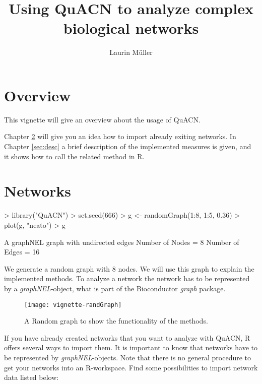 \documentclass[a4paper]{article}
\title{Using QuACN to analyze complex biological networks}
\author{Laurin M\"uller}
\begin{document}
\maketitle
\tableofcontents
\section{Overview}
This vignette will give an overview about the usage of QuACN. 

Chapter \ref{sec:nw} will give you an idea how to import already exiting networks. In Chapter \ref{sec:desc} a brief description of the implemented measures is given, and it shows how to call the related method in R.



\section{Networks}
\label{sec:nw}

\begin{Schunk}
\begin{Sinput}
> library("QuACN")
> set.seed(666)
> g <- randomGraph(1:8, 1:5, 0.36)
> plot(g, "neato")
> g
\end{Sinput}
\begin{Soutput}
A graphNEL graph with undirected edges
Number of Nodes = 8 
Number of Edges = 16 
\end{Soutput}
\end{Schunk}
We generate a random graph with 8 nodes.  We will use this graph to explain the implemented methods. To analyze a network the network has to be represented by a \textit{graphNEL}-object, what is part of the Bioconductor \textit{graph} package.

\begin{figure}
\begin{center}
\texttt{[image: vignette-randGraph]}
\end{center}
\caption{A Random graph to show the functionality of the methods.}
\label{fig:randGraph}
\end{figure}

If you have already created networks that you want to analyze with QuACN, R offers several ways to import them. It is important to know that networks have to be represented by \textit{graphNEL}-objects. Note that there is no general procedure to get your networks into an R-workspace. Find some possibilities to import network data listed below:
\end{document}
